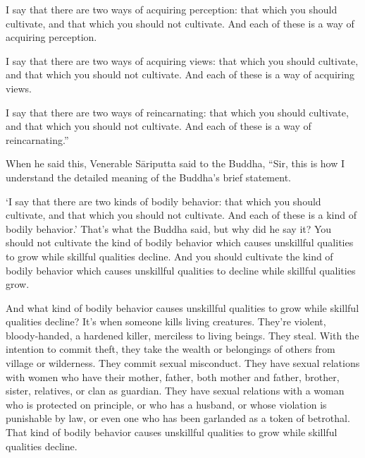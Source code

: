 \documentclass[12pt,openany]{book}%
\begin{document}
I say that there are two ways of acquiring perception: that which you should cultivate, and that which you should not cultivate. And each of these is a way of acquiring perception. 

I say that there are two ways of acquiring views: that which you should cultivate, and that which you should not cultivate. And each of these is a way of acquiring views. 

I say that there are two ways of reincarnating: that which you should cultivate, and that which you should not cultivate. And each of these is a way of reincarnating.” 

When he said this, Venerable \textsanskrit{Sāriputta} said to the Buddha, “Sir, this is how I understand the detailed meaning of the Buddha’s brief statement. 

‘I say that there are two kinds of bodily behavior: that which you should cultivate, and that which you should not cultivate. And each of these is a kind of bodily behavior.’ That’s what the Buddha said, but why did he say it? You should not cultivate the kind of bodily behavior which causes unskillful qualities to grow while skillful qualities decline. And you should cultivate the kind of bodily behavior which causes unskillful qualities to decline while skillful qualities grow. 

And what kind of bodily behavior causes unskillful qualities to grow while skillful qualities decline? It’s when someone kills living creatures. They’re violent, bloody-handed, a hardened killer, merciless to living beings. They steal. With the intention to commit theft, they take the wealth or belongings of others from village or wilderness. They commit sexual misconduct. They have sexual relations with women who have their mother, father, both mother and father, brother, sister, relatives, or clan as guardian. They have sexual relations with a woman who is protected on principle, or who has a husband, or whose violation is punishable by law, or even one who has been garlanded as a token of betrothal. That kind of bodily behavior causes unskillful qualities to grow while skillful qualities decline. 
\end{document}
